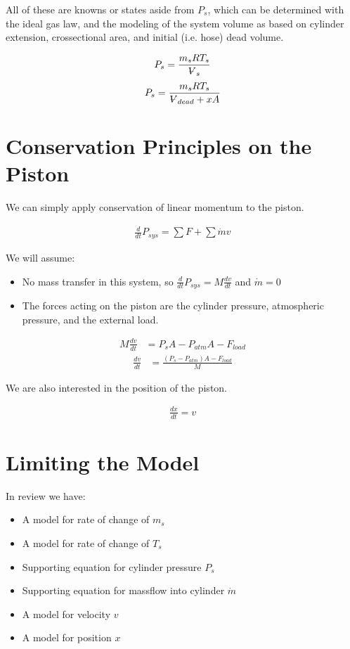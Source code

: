 \documentclass[10pt,letterpaper]{article}
\newcommand{\volume}{{\ooalign{\hfil$V$\hfil\cr\kern0.08em--\hfil\cr}}}
\begin{document}
	All of these are knowns or states aside from $P_s$, which can be determined with the ideal gas law, and the modeling of the system volume as based on cylinder extension, crossectional area, and initial (i.e. hose) dead volume.
	
	\begin{align}
		P_s = \frac{m_s R T_s}{\volume_s} \nonumber
	\end{align}\begin{align} \label{eq:sup_P}
		P_s = \frac{m_s R T_s}{\volume_{dead} + x A}
	\end{align}
	
	\section*{Conservation Principles on the Piston}
	
	We can simply apply conservation of linear momentum to the piston.
	
	\begin{align}
		\frac{d}{dt} P_{sys}= \sum F + \sum \dot{m} v \nonumber
	\end{align}
	
	We will assume:
	\begin{itemize}
		\item No mass transfer in this system, so $\frac{d}{dt} P_{sys} = M \frac{dv}{dt}$ and $\dot{m}=0$
		\item The forces acting on the piston are the cylinder pressure, atmospheric pressure, and the external load.
	\end{itemize}
	
	\begin{align}
		M \frac{dv}{dt} &= P_s A - P_{atm} A - F_{load} \nonumber
	\end{align}\begin{align}  \label{eq:ddt_v}
		\frac{dv}{dt} &= \frac{(P_s - P_{atm}) A - F_{load}}{M}
	\end{align}
	
	We are also interested in the position of the piston.
	
	\begin{align} \label{eq:ddt_x}
		\frac{dx}{dt} = v
	\end{align}
	
	\section*{Limiting the Model}
	In review we have:
	
	\begin{itemize}
		\item A model for rate of change of $m_s$
		\item A model for rate of change of $T_s$
		\item Supporting equation for cylinder pressure $P_s$
		\item Supporting equation for massflow into cylinder $\dot{m}$
		\item A model for velocity $v$
		\item A model for position $x$
	\end{itemize}
	
\end{document}
